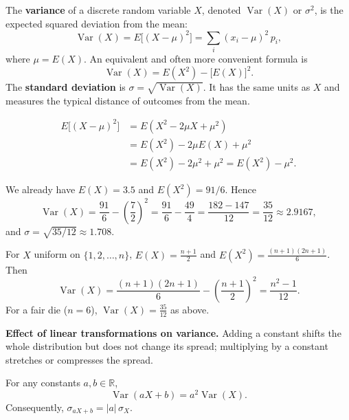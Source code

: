 \documentclass[11pt]{article}
\begin{document}
\begin{definition}
The \textbf{variance} of a discrete random variable $X$, denoted $\operatorname{Var}(X)$ or $\sigma^2$, is the expected squared deviation from the mean:
\[
\operatorname{Var}(X) = E\bigl[(X - \mu)^2\bigr] = \sum_i (x_i - \mu)^2\,p_i,
\]
where $\mu = E(X)$. An equivalent and often more convenient formula is
\[
\operatorname{Var}(X) = E(X^2) - \bigl[E(X)\bigr]^2.
\]
The \textbf{standard deviation} is $\sigma = \sqrt{\operatorname{Var}(X)}$. It has the same units as $X$ and measures the typical distance of outcomes from the mean.
\end{definition}

\begin{propriete}
\begin{align*}
E\bigl[(X-\mu)^2\bigr] &= E(X^2 - 2\mu X + \mu^2) \\
&= E(X^2) - 2\mu E(X) + \mu^2 \\
&= E(X^2) - 2\mu^2 + \mu^2 = E(X^2) - \mu^2.
\end{align*}
\end{propriete}

\begin{exemplebox}
We already have $E(X)=3.5$ and $E(X^2)=91/6$. Hence
\[
\operatorname{Var}(X) = \frac{91}{6} - \left(\frac{7}{2}\right)^2 = \frac{91}{6} - \frac{49}{4} = \frac{182-147}{12} = \frac{35}{12} \approx 2.9167,
\]
and $\sigma = \sqrt{35/12} \approx 1.708$.
\end{exemplebox}

\begin{exemplebox}
For $X$ uniform on $\{1,2,\dots,n\}$, $E(X)=\frac{n+1}{2}$ and $E(X^2)=\frac{(n+1)(2n+1)}{6}$. Then
\[
\operatorname{Var}(X) = \frac{(n+1)(2n+1)}{6} - \left(\frac{n+1}{2}\right)^2 = \frac{n^2-1}{12}.
\]
For a fair die ($n=6$), $\operatorname{Var}(X)=\frac{35}{12}$ as above.
\end{exemplebox}

\textbf{Effect of linear transformations on variance.} Adding a constant shifts the whole distribution but does not change its spread; multiplying by a constant stretches or compresses the spread.

\begin{propriete}
For any constants $a,b \in \mathbb{R}$,
\[
\operatorname{Var}(aX + b) = a^2 \operatorname{Var}(X).
\]
Consequently, $\sigma_{aX+b} = |a|\,\sigma_X$.
\end{propriete}
\end{document}
